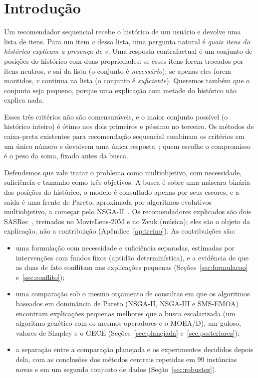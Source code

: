 \section{Introdução}

Um recomendador sequencial recebe o histórico de um usuário e devolve uma lista
de itens. Para um item $v$ dessa lista, uma pergunta natural é \emph{quais
itens do histórico explicam a presença de $v$}. Uma resposta contrafactual é um
conjunto de posições do histórico com duas propriedades: se esses itens forem
trocados por itens neutros, $v$ sai da lista (o conjunto é \emph{necessário});
se apenas eles forem mantidos, $v$ continua na lista (o conjunto é
\emph{suficiente}). Queremos também que o conjunto seja pequeno, porque uma
explicação com metade do histórico não explica nada.

Esses três critérios não são comensuráveis, e o maior conjunto possível (o
histórico inteiro) é ótimo nos dois primeiros e péssimo no terceiro. Os métodos
de caixa-preta existentes para recomendação sequencial combinam os critérios em
um único número e devolvem uma única
resposta~\cite{scarcelli2025gece,kim2026trace}; quem escolhe o compromisso é o
peso da soma, fixado antes da busca.

Defendemos que vale tratar o problema como multiobjetivo, com necessidade,
suficiência e tamanho como três objetivos. A busca é sobre uma máscara binária
das posições do histórico, o modelo é consultado apenas por seus escores, e a
saída é uma frente de Pareto, aproximada por algoritmos evolutivos
multiobjetivo, a começar pelo NSGA-II~\cite{deb2002nsga2}. Os recomendadores
explicados são dois SASRec~\cite{kang2018sasrec}, treinados no MovieLens-20M e
no Zvuk (música); eles são o objeto da explicação, não a contribuição
(Apêndice~\ref{ap:treino}). As contribuições são:
\begin{itemize}
  \item uma formulação com necessidade e suficiência separadas, estimadas por
        intervenções com fundos fixos (aptidão determinística), e a evidência
        de que as duas de fato conflitam nas explicações pequenas
        (Seções~\ref{sec:formulacao} e~\ref{sec:conflito});
  \item uma comparação sob o mesmo orçamento de consultas em que os
        algoritmos baseados em dominância de Pareto (NSGA-II, NSGA-III e
        SMS-EMOA) encontram explicações
        pequenas melhores que a busca escalarizada (um algoritmo genético com
        os mesmos operadores e o MOEA/D), um guloso, valores de Shapley e o
        GECE (Seções~\ref{sec:planejada} e~\ref{sec:posteriores});
  \item a separação entre a comparação planejada e os experimentos decididos
        depois dela, com as conclusões dos métodos centrais repetidas em 99
        instâncias novas e em um segundo conjunto de dados
        (Seção~\ref{sec:robustez}).
\end{itemize}

